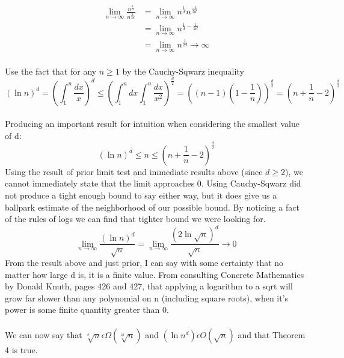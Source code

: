 \documentclass[12pt]{article}
\begin{document}
\begin{align}
\lim_{n\to\infty} \frac{n^{\frac{1}{d}}}{n^{\frac{1}{2d}}} &= \lim_{n\to\infty} n^{\frac{1}{d}} n^{\frac{-1}{2d}}\\
&= \lim_{n\to\infty} n^{\frac{1}{d}-\frac{1}{2d}}\\
&= \lim_{n\to\infty} n^{\frac{1}{2d}} \rightarrow \infty
\end{align}\\
Use the fact that for any \begin{math} n  \geq 1\end{math} by the Cauchy-Sqwarz inequality\
\[(\ln{n})^d = (\int_{1}^{n} \frac{dx}{x})^d \leq (\int_{1}^{n} dx \int_{1}^{n} \frac{dx}{x^2})^{\frac{d}{2}} = ((n-1)(1-\frac{1}{n}))^{\frac{d}{2}} = (n + \frac{1}{n} - 2)^{\frac{d}{2}}\]\\
Producing an important result for intuition when considering the smallest value of d:
\[(\ln{n})^d \leq n \leq (n + \frac{1}{n} - 2)^{\frac{d}{2}}\]
Using the result of prior limit test and immediate results above (since \begin{math}d \geq 2\end{math}), we cannot immediately state that the limit approaches 0. Using Cauchy-Sqwarz did not produce a tight enough bound to say either way, but it does give us a ballpark estimate of the neighborhood of our possible bound. By noticing a fact of the rules of logs we can find that tighter bound we were looking for.
\[\lim_{n\to\infty} \frac{(\ln{n})^d}{\sqrt{n}} =\lim_{n\to\infty} \frac{(2\ln{\sqrt{n}})^d}{\sqrt{n}} \rightarrow 0\]
From the result above and just prior, I can say with some certainty that no matter how large d is, it is a finite value. From consulting Concrete Mathematics by Donald Knuth, pages 426 and 427, that applying a logarithm to a sqrt will grow far slower than any polynomial on n (including square roots), when it's power is some finite quantity greater than 0.\\\\
We can now say that \begin{math}\sqrt[^d]{n} \epsilon \Omega (\sqrt[^{2d}]{n})\end{math} and \begin{math}(\ln {n}^d) \epsilon O(\sqrt{n})\end{math} and that Theorem 4 is true.
\end{document}

